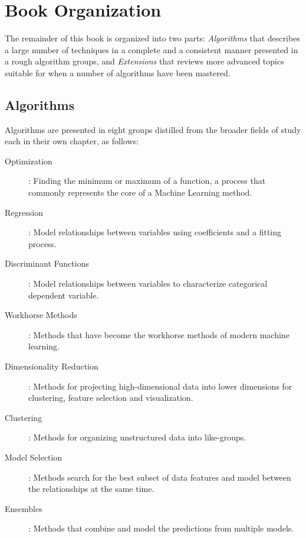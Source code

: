 

\section{Book Organization} 
\label{intro:organization}
The remainder of this book is organized into two parts: \emph{Algorithms} that describes a large number of techniques in a complete and a consistent manner presented in a rough algorithm groups, and \emph{Extensions} that reviews more advanced topics suitable for when a number of algorithms have been mastered.

% 
%
\subsection{Algorithms}
Algorithms are presented in eight groups distilled from the broader fields of study each in their own chapter, as follows: 

\begin{description}
	\item[Optimization]: Finding the minimum or maximum of a function, a process that commonly represents the core of a Machine Learning method.
	\item[Regression]: Model relationships between variables using coefficients and a fitting process.
	\item[Discriminant Functions]:	Model relationships between variables to characterize categorical dependent variable.
	\item[Workhorse Methods]: Methods that have become the workhorse methods of modern machine learning.
	\item[Dimensionality Reduction]: Methods for projecting high-dimensional data into lower dimensions for clustering, feature selection and visualization.
	\item[Clustering]: Methods for organizing unstructured data into like-groups.
	\item[Model Selection]: Methods search for the best subset of data features and model between the relationships at the same time.
	\item[Ensembles]:	Methods that combine and model the predictions from multiple models.
\end{description}

